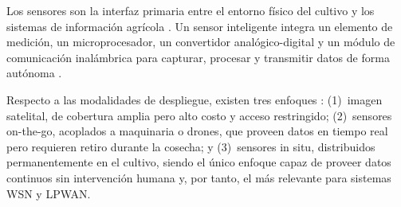 Los sensores son la interfaz primaria entre el entorno físico del
cultivo y los sistemas de información agrícola
\parencite{rajak2023internet}. Un sensor inteligente integra
un elemento de medición, un microprocesador, un convertidor
analógico-digital y un módulo de comunicación inalámbrica para
capturar, procesar y transmitir datos de forma autónoma
\parencite{rajak2023internet}.

Respecto a las modalidades de despliegue, existen tres enfoques
\parencite{alahmad2023applying}: (1)~imagen satelital,
de cobertura amplia pero alto costo y acceso restringido;
(2)~sensores on-the-go, acoplados a maquinaria
o drones, que proveen datos en tiempo real pero requieren retiro
durante la cosecha; y (3)~sensores in situ,
distribuidos permanentemente en el cultivo, siendo el único enfoque
capaz de proveer datos continuos sin intervención humana y, por
tanto, el más relevante para sistemas WSN y LPWAN.

